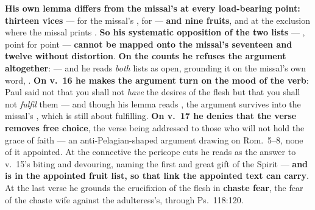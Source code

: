 \begin{witnessnote}
 \textbf{His own lemma differs from the missal's at every
load-bearing point: thirteen vices} ---  for the missal's
,  for  --- \textbf{and nine fruits},
and at the exclusion  where the missal prints
. \textbf{So his systematic opposition of the two lists}
--- , point for point ---
\textbf{cannot be mapped onto the missal's seventeen and twelve without
distortion}. \textbf{On
the counts he refuses the argument altogether}:  --- and he reads \emph{both} lists as
open, grounding it on the missal's own word, . \textbf{On v.~16 he makes the argument
turn on the mood of the verb}: Paul said not that you shall not \emph{have} the
desires of the flesh but that you shall not \emph{fulfil} them --- and though
his lemma reads , the argument
survives into the missal's , which is still about
fulfilling. \textbf{On v.~17 he denies that the verse removes free choice}, the
verse being addressed to those who will not hold the grace of faith --- an
anti-Pelagian-shaped argument drawing on Rom.~5--8, none of it appointed. At
the connective the pericope cuts he reads  as the answer
to v.~15's biting and devouring, naming  the
first and great gift of the Spirit --- \textbf{and  is in the
appointed fruit list, so that link the appointed text can carry}. At the last
verse he grounds the crucifixion of the flesh in \textbf{chaste fear}, the fear
of the chaste wife against the adulteress's, through Ps.~118:120.
\end{witnessnote}

